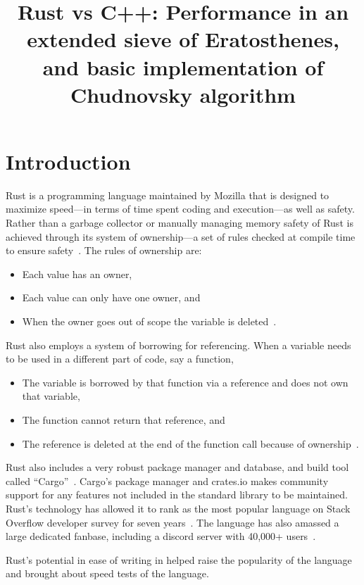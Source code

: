 \documentclass[10pt]{IEEEtran}
\begin{document}
\title{Rust vs C++: Performance in an extended sieve of Eratosthenes, and basic implementation of Chudnovsky algorithm}
\author{
}
\date{}

\maketitle


\section{Introduction}
Rust is a programming language maintained by Mozilla that is designed to maximize speed---in terms of time spent coding and 
execution---as well as safety. Rather than a garbage collector or manually managing memory safety of Rust is achieved 
through its system of ownership---a set of rules checked at compile time to ensure safety~\cite{rust2023}. The rules of ownership are:
\begin{itemize}
    \item Each value has an owner,
    \item Each value can only have one owner, and
    \item When the owner goes out of scope the variable is deleted~\cite{rust2023}.
\end{itemize}
Rust also employs a system of borrowing for referencing. When a variable needs to be used in a different part of code, say a function, 
\begin{itemize}
    \item The variable is borrowed by that function via a reference and does not own that variable,
    \item The function cannot return that reference, and
    \item The reference is deleted at the end of the function call because of ownership~\cite{rust2023}.
\end{itemize}
Rust also includes a very robust package manager and database, and build tool called “Cargo”~\cite{cargobook}. 
Cargo's package manager and crates.io makes community support for any features not included in the standard library to be maintained.
Rust's technology has allowed it to rank as the most popular language on Stack Overflow developer survey for seven years~\cite{stackoverflow2022}. 
The language has also amassed a large dedicated fanbase, including a discord server with 40,000+ users~\cite{discord}.
\par
Rust's potential in ease of writing in helped raise the popularity of the language and brought about speed tests of the language. 
\end{document}
